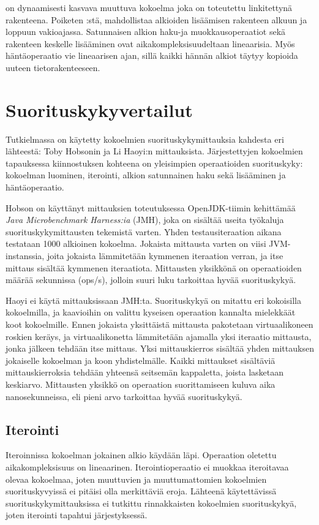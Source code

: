  on dynaamisesti kasvava muuttuva kokoelma joka on toteutettu linkitettynä rakenteena. Poiketen :stä,  mahdollistaa alkioiden lisäämisen rakenteen alkuun ja loppuun vakioajassa. Satunnaisen alkion haku-ja muokkausoperaatiot sekä rakenteen keskelle lisääminen ovat aikakompleksisuudeltaan lineaarisia. Myös häntäoperaatio vie lineaarisen ajan, sillä kaikki hännän alkiot täytyy kopioida uuteen tietorakenteeseen.
\cite{scalaCollections}


\section{Suorituskykyvertailut}
Tutkielmassa on käytetty kokoelmien suorituskykymittauksia kahdesta eri lähteestä: Toby Hobsonin\cite{hobsonBenchmark} ja Li Haoyi:n\cite{haoyiBenchmark} mittauksista. Järjestettyjen kokoelmien tapauksessa kiinnostuksen kohteena on yleisimpien operaatioiden suorituskyky: kokoelman luominen, iterointi, alkion satunnainen haku sekä lisääminen ja häntäoperaatio. 

Hobson\cite{hobsonBenchmark} on käyttänyt mittauksien toteutuksessa OpenJDK-tiimin kehittämää \textit{Java Microbenchmark Harness:ia} (JMH), joka on sisältää useita työkaluja suorituskykymittausten tekemistä varten. Yhden testausiteraation aikana testataan 1000 alkioinen kokoelma. Jokaista mittausta varten on viisi JVM-instanssia, joita jokaista lämmitetään kymmenen iteraation verran, ja itse mittaus sisältää kymmenen iteraatiota. Mittausten yksikkönä on operaatioiden määrää sekunnissa (ops/s), jolloin suuri luku tarkoittaa hyvää suorituskykyä.
\cite{highPerformanceProgramming}

Haoyi ei käytä mittauksissaan\cite{haoyiBenchmark} JMH:ta. Suorituskykyä on mitattu eri kokoisilla kokoelmilla, ja kaavioihin on valittu kyseisen operaation kannalta mielekkäät koot kokoelmille. Ennen jokaista yksittäistä mittausta pakotetaan virtuaalikoneen roskien keräys, ja virtuaalikonetta lämmitetään ajamalla yksi iteraatio mittausta, jonka jälkeen tehdään itse mittaus. Yksi mittauskierros sisältää yhden mittauksen jokaiselle kokoelman ja koon yhdistelmälle. Kaikki mittaukset sisältäviä mittauskierroksia tehdään yhteensä seitsemän kappaletta, joista lasketaan keskiarvo. Mittausten yksikkö on operaation suorittamiseen kuluva aika nanosekunneissa, eli pieni arvo tarkoittaa hyvää suorituskykyä. 


\subsection{Iterointi}
Iteroinnissa kokoelman jokainen alkio käydään läpi. Operaation oletettu aikakompleksisuus on lineaarinen. Iterointioperaatio ei muokkaa iteroitavaa olevaa kokoelmaa, joten muuttuvien ja muuttumattomien kokoelmien suorituskyvyissä ei pitäisi olla merkittäviä eroja. Lähteenä käytettävissä suorituskykymittauksissa ei tutkittu rinnakkaisten kokoelmien suorituskykyä, joten iterointi tapahtui järjestyksessä.

